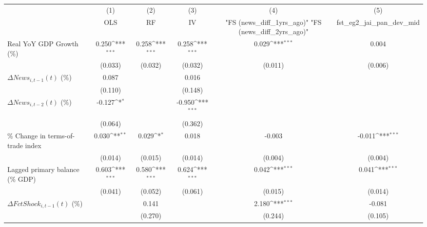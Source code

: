 {
\def\sym#1{\ifmmode^{#1}\else\(^{#1}\)\fi}
\begin{tabular}{l*{5}{c}}
\toprule
                    &\multicolumn{1}{c}{(1)}&\multicolumn{1}{c}{(2)}&\multicolumn{1}{c}{(3)}&\multicolumn{1}{c}{(4)}&\multicolumn{1}{c}{(5)}\\
                    &\multicolumn{1}{c}{OLS}&\multicolumn{1}{c}{RF}&\multicolumn{1}{c}{IV}&\multicolumn{1}{c}{ "FS (news_diff_1yrs_ago)"  "FS (news_diff_2yrs_ago)" }&\multicolumn{1}{c}{fst_eg2_jai_pan_dev_mid}\\
\midrule
Real YoY GDP Growth (\%)&       0.250\sym{***}&       0.258\sym{***}&       0.258\sym{***}&       0.029\sym{***}&       0.004         \\
                    &     (0.033)         &     (0.032)         &     (0.032)         &     (0.011)         &     (0.006)         \\
\addlinespace
$ \Delta News_{i,t-1}(t)$ (\%)&       0.087         &                     &       0.016         &                     &                     \\
                    &     (0.110)         &                     &     (0.148)         &                     &                     \\
\addlinespace
$ \Delta News_{i,t-2}(t)$ (\%)&      -0.127\sym{*}  &                     &      -0.950\sym{***}&                     &                     \\
                    &     (0.064)         &                     &     (0.362)         &                     &                     \\
\addlinespace
\% Change in terms-of-trade index&       0.030\sym{**} &       0.029\sym{*}  &       0.018         &      -0.003         &      -0.011\sym{***}\\
                    &     (0.014)         &     (0.015)         &     (0.014)         &     (0.004)         &     (0.004)         \\
\addlinespace
Lagged primary balance (\% GDP)&       0.603\sym{***}&       0.580\sym{***}&       0.624\sym{***}&       0.042\sym{***}&       0.041\sym{***}\\
                    &     (0.041)         &     (0.052)         &     (0.061)         &     (0.015)         &     (0.014)         \\
\addlinespace
$ \Delta FctShock_{i,t-1}(t)$ (\%)&                     &       0.141         &                     &       2.180\sym{***}&      -0.081         \\
                    &                     &     (0.270)         &                     &     (0.244)         &     (0.105)         \\

\end{tabular}}

